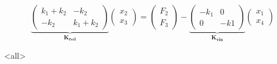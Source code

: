 \begin{equation}
  \underbrace{
  \begin{pmatrix} k_1 + k_2 & - k_2 \\ -k_2 & k_1 + k_2 \end{pmatrix}
  }_{ \mathbf{K_{red} } }
  \begin{pmatrix}x_2 \\ x_3\end{pmatrix}
  = 
  \begin{pmatrix}F_2 \\ F_3\end{pmatrix}
  -
  \underbrace{
  \begin{pmatrix} -k_1 & 0 \\ 0 & -k1 \end{pmatrix}
  }_{ \mathbf{ K_{vin} } }
  \begin{pmatrix}x_1 \\ x_4\end{pmatrix}
\end{equation}


\mode*



\mode<all>
